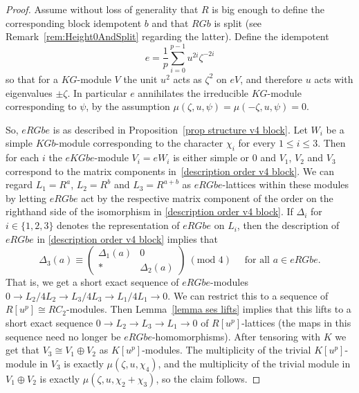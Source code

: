 \documentclass[11pt, a4paper]{amsart}
\theoremstyle{definition}
\theoremstyle{definition}
\renewcommand{\leq}{\leqslant}
\begin{document}
\begin{proof}
    Assume without loss of generality that $R$ is big enough to define the corresponding block idempotent $b$ and that $RGb$ is split (see Remark~\ref{rem:Height0AndSplit} regarding the latter). 
    Define the idempotent 
    \begin{equation}
        e=\frac{1}{p}\sum_{i=0}^{p-1} u^{2i}\zeta^{-2i}
    \end{equation}
    so that for a $KG$-module $V$ the unit $u^2$ acts as $\zeta^2$ on $eV$, and therefore $u$ acts with eigenvalues $\pm\zeta$. In particular $e$ annihilates the irreducible $KG$-module corresponding to $\psi$, by the assumption $\mu(\zeta, u, \psi) = \mu(-\zeta, u, \psi) = 0$.
    
    So, $eRGbe$ is as described in Proposition~\ref{prop structure v4 block}. Let $W_i$ be a simple $KGb$-module corresponding to the character $\chi_i$ for every $1 \leq i \leq 3$. Then for each $i$ the $eKGbe$-module $V_i=eW_i$ is either simple or $0$ and $V_1$, $V_2$ and $V_3$ correspond to the matrix components in~\eqref{description order v4 block}. We can regard $L_1=R^a$, $L_2=R^b$ and $L_3=R^{a+b}$ as $eRGbe$-lattices within these modules by letting $eRGbe$ act by the respective matrix component of the order on the righthand side of the isomorphism in \eqref{description order v4 block}. If $\Delta_i$ for $i\in\{1,2,3\}$ denotes the representation of $eRGbe$ on $L_i$, then the description of $eRGbe$ in \eqref{description order v4 block} implies that
    \begin{equation}
        \Delta_3(a) \equiv \left( \begin{array}{cc} \Delta_1(a) & 0 \\ * & \Delta_2(a) \end{array} \right)\ (\textrm{mod }4) \quad \textrm{ for all $a\in eRGbe$.}
    \end{equation}
    That is, we get a short exact sequence of $eRGbe$-modules $0\longrightarrow L_2/4L_2\longrightarrow L_3/4L_3\longrightarrow L_1/4L_1\longrightarrow 0$. We can restrict this to a sequence of $R[u^p]\cong RC_2$-modules. Then Lemma~\ref{lemma ses lifts} implies that this lifts to a short exact sequence $0\longrightarrow L_2 \longrightarrow L_3\longrightarrow L_1\longrightarrow 0$ of $R[u^p]$-lattices (the maps in this sequence need no longer be $eRGbe$-homomorphisms). After tensoring with $K$ we get that $V_3\cong V_1\oplus V_2$ as $K[u^p]$-modules. The multiplicity of the trivial $K[u^p]$-module in $V_3$ is exactly $\mu(\zeta, u, \chi_4)$, and the multiplicity of the trivial module in $V_1 \oplus V_2$ is exactly $\mu(\zeta, u, \chi_2+\chi_3)$, so the claim follows.
\end{proof}
\end{document}
